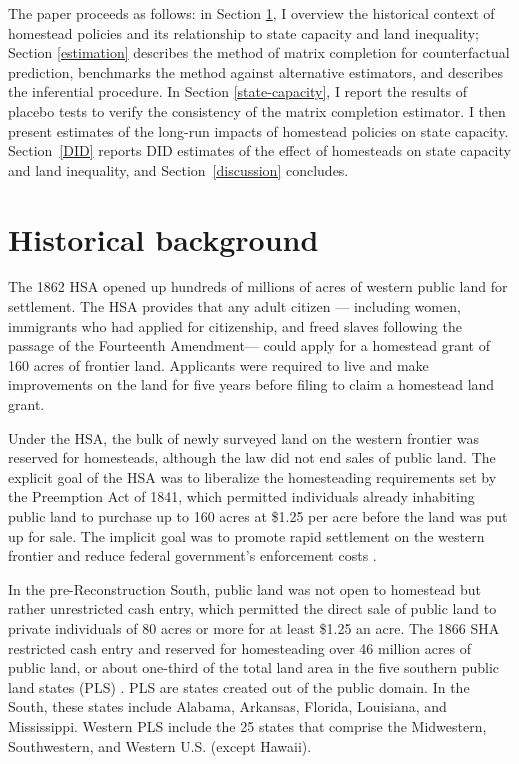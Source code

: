 \documentclass[hidelinks,12pt]{article}
\begin{document}
The paper proceeds as follows: in Section \ref{history}, I overview the historical context of homestead policies and its relationship to state capacity and land inequality; Section \ref{estimation} describes the method of matrix completion for counterfactual prediction, benchmarks the method against alternative estimators, and describes the inferential procedure. In Section \ref{state-capacity}, I report the results of placebo tests to verify the consistency of the matrix completion estimator. I then present estimates of the long-run impacts of homestead policies on state capacity. Section~\ref{DID} reports DID estimates of the effect of homesteads on state capacity and land inequality, and Section~\ref{discussion} concludes. 

\setcounter{section}{1} %
\section{Historical background} \label{history}

The 1862 HSA opened up hundreds of millions of acres of western public land for settlement. The HSA provides that any adult citizen --- including women, immigrants who had applied for citizenship, and freed slaves following the passage of the Fourteenth Amendment---  could apply for a homestead grant of 160 acres of frontier land. Applicants were required to live and make improvements on the land for five years before filing to claim a homestead land grant. 

Under the HSA, the bulk of newly surveyed land on the western frontier was reserved for homesteads, although the law did not end sales of public land. The explicit goal of the HSA was to liberalize the homesteading requirements set by the Preemption Act of 1841, which permitted individuals already inhabiting public land to purchase up to 160 acres at \$1.25 per acre before the land was put up for sale. The implicit goal was to promote rapid settlement on the western frontier and reduce federal government's enforcement costs \citep{allen1991homesteading}. 

In the pre-Reconstruction South, public land was not open to homestead but rather unrestricted cash entry, which permitted the direct sale of public land to private individuals of 80 acres or more for at least \$1.25 an acre. The 1866 SHA restricted cash entry and reserved for homesteading over 46 million acres of public land, or about one-third of the total land area in the five southern public land states (PLS) \citep[pp. 13]{lanza1999agrarianism}. PLS are states created out of the public domain. In the South, these states include Alabama, Arkansas, Florida, Louisiana, and Mississippi. Western PLS include the 25 states that comprise the Midwestern, Southwestern, and Western U.S. (except Hawaii). 
\end{document}
